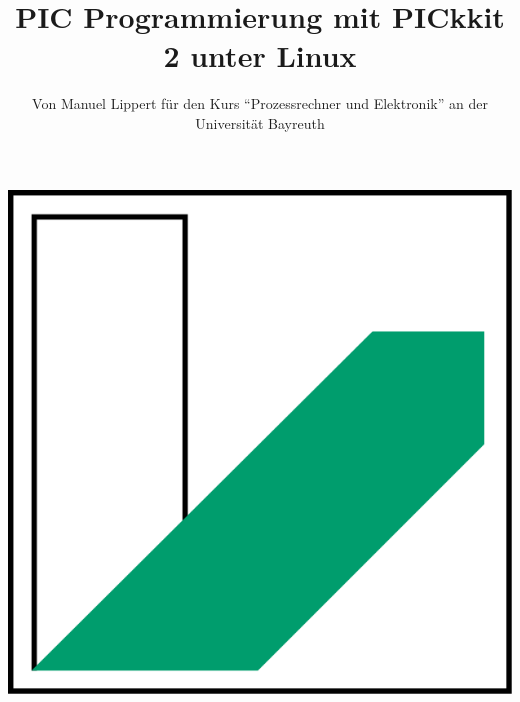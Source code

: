 \documentclass[paper=a4,bibliography=totoc,BCOR=10mm,numbers=noenddot,fontsize=11pt]{article}
\begin{document}
\title{\vspace{-2.0cm}\textbf{\fontsize{30}{0}PIC Programmierung mit PICkkit 2 unter Linux}}
\author{Von Manuel Lippert für den Kurs \enquote{Prozessrechner und Elektronik} an der Universität Bayreuth}
\maketitle
\begin{center}
    \includegraphics[scale=0.1]{UniBT.png}
\end{center}

\vspace{5cm}




\newpage






\end{document}
